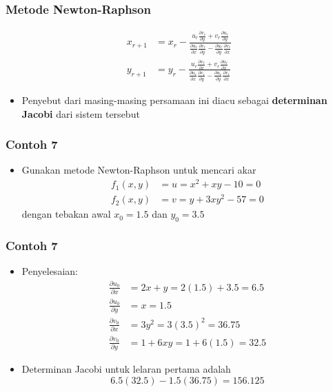 \documentclass[pdflatex,compress]{beamer}
\begin{document}
\begin{frame}
	\frametitle{Metode Newton-Raphson}
	\begin{align*}
		x_{r+1} &= x_r - \frac{ u_r \frac{\partial v_r}{\partial y} + v_r \frac{\partial u_r}{\partial y} }{ \frac{\partial u_r}{\partial x}\frac{\partial v_r}{\partial y} - \frac{\partial u_r}{\partial y}\frac{\partial v_r}{\partial x} } \\
		y_{r+1} &= y_r - \frac{ u_r \frac{\partial v_r}{\partial x} + v_r \frac{\partial u_r}{\partial x} }{ \frac{\partial u_r}{\partial x}\frac{\partial v_r}{\partial y} - \frac{\partial u_r}{\partial y}\frac{\partial v_r}{\partial x} } 
	\end{align*}
	\begin{itemize}
		\item Penyebut dari masing-masing persamaan ini diacu
		sebagai \textbf{determinan Jacobi} dari sistem tersebut
	\end{itemize}
\end{frame}

\begin{frame}
	\frametitle{Contoh 7}
	\begin{itemize}
		\item Gunakan metode Newton-Raphson untuk mencari akar
		\begin{align*}
			f_1(x,y) &= u = x^2 + xy -10 = 0 \\
			f_2 (x,y) &= v = y + 3xy^2 - 57 = 0
		\end{align*}
		dengan tebakan awal $ x_0 =1.5 $ dan $ y_0 = 3.5 $
	\end{itemize}
\end{frame}

\begin{frame}
	\frametitle{Contoh 7}
	\begin{itemize}
		\item Penyelesaian:
		\begin{align*}
		\frac{\partial u_0}{\partial x} &= 2x + y = 2(1.5) + 3.5 = 6.5 \\
		\frac{\partial u_0}{\partial y} &= x = 1.5 \\
		\frac{\partial v_0}{\partial x} &= 3y^2 = 3(3.5)^2 = 36.75\\
		\frac{\partial v_0}{\partial y} &= 1 + 6xy = 1 + 6(1.5) = 32.5
		\end{align*}
		\item Determinan Jacobi untuk lelaran pertama adalah
		\[ 6.5(32.5) - 1.5(36.75) = 156.125 \]
	\end{itemize}
\end{frame}
\end{document}
